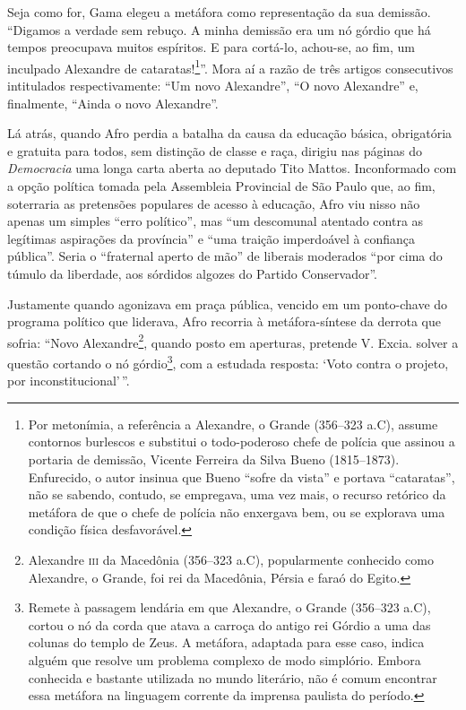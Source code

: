 Seja como for, Gama elegeu a metáfora como representação da sua
demissão. ``Digamos a verdade sem rebuço. A minha demissão era um nó
górdio que há tempos preocupava muitos espíritos. E para cortá-lo,
achou-se, ao fim, um inculpado Alexandre de cataratas!\footnote{Por
  metonímia, a referência a Alexandre, o Grande (356--323 a.C), assume
  contornos burlescos e substitui o todo-poderoso chefe de polícia que
  assinou a portaria de demissão, Vicente Ferreira da Silva Bueno
  (1815--1873). Enfurecido, o autor insinua que Bueno ``sofre da vista'' e
  portava ``cataratas'', não se sabendo, contudo, se empregava, uma vez
  mais, o recurso retórico da metáfora de que o chefe de polícia não
  enxergava bem, ou se explorava uma condição física desfavorável.}''.
Mora aí a razão de três artigos consecutivos intitulados
respectivamente: ``Um novo Alexandre'', ``O novo Alexandre'' e,
finalmente, ``Ainda o novo Alexandre''.

Lá atrás, quando Afro perdia a batalha da causa da educação
básica, obrigatória e gratuita para todos, sem distinção de classe e
raça, dirigiu nas páginas do \emph{Democracia} uma longa carta aberta ao
deputado Tito Mattos. Inconformado com a opção política tomada pela
Assembleia Provincial de São Paulo que, ao fim, soterraria as pretensões
populares de acesso à educação, Afro viu nisso não apenas um
simples ``erro político'', mas ``um descomunal atentado contra as legítimas
aspirações da província'' e ``uma traição imperdoável à confiança
pública''. Seria o ``fraternal aperto de mão'' de liberais moderados ``por
cima do túmulo da liberdade, aos sórdidos algozes do Partido
Conservador''.

Justamente quando agonizava em praça pública, vencido em um ponto-chave
do programa político que liderava, Afro recorria à
metáfora-síntese da derrota que sofria: ``Novo Alexandre\footnote{Alexandre \textsc{iii} da Macedônia (356--323 a.C), popularmente conhecido como
  Alexandre, o Grande, foi rei da Macedônia, Pérsia e faraó do Egito.},
quando posto em aperturas, pretende V. Excia. solver a questão cortando
o nó górdio\footnote{Remete à passagem lendária em que Alexandre, o
  Grande (356--323 a.C), cortou o nó da corda que atava a carroça do
  antigo rei Górdio a uma das colunas do templo de Zeus. A metáfora,
  adaptada para esse caso, indica alguém que resolve um problema
  complexo de modo simplório. Embora conhecida e bastante utilizada no
  mundo literário, não é comum encontrar essa metáfora na linguagem
  corrente da imprensa paulista do período.}, com a estudada resposta:
`Voto contra o projeto, por inconstitucional'\,''.

